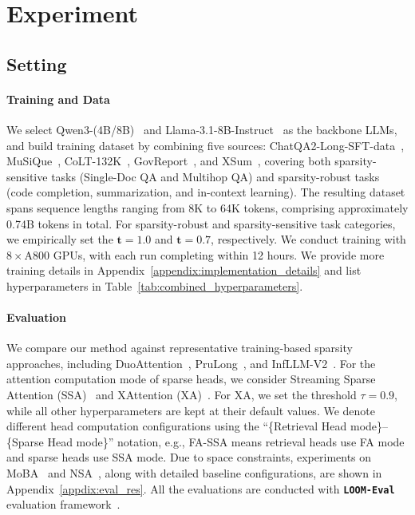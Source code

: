 

\section{Experiment}
\label{sec:experiment}

\subsection{Setting}
\label{subsec:exp_settings}

\paragraph{Training and Data}
\label{subsec:train_settings}
We select Qwen3-(4B/8B)~\citep{yang2025qwen3technicalreport} and Llama-3.1-8B-Instruct~\citep{grattafiori2024llama} as the backbone LLMs, and build training dataset by combining five sources: ChatQA2-Long-SFT-data~\citep{xu2024chatqa}, MuSiQue~\citep{trivedi2022musique}, CoLT-132K~\citep{li2025aixcoder}, GovReport~\citep{huang-etal-2021-efficient}, and XSum~\citep{xsum-emnlp}, covering both sparsity-sensitive tasks (Single-Doc QA and Multihop QA) and sparsity-robust tasks (code completion, summarization, and in-context learning).
The resulting dataset spans sequence lengths ranging from 8K to 64K tokens, comprising approximately 0.74B tokens in total. 
For sparsity-robust and sparsity-sensitive task categories, we empirically set the $\boldsymbol{t}=1.0$ and $\boldsymbol{t}=0.7$, respectively.
We conduct training with $8\times$A800 GPUs, with each run completing within 12 hours.
We provide more training details in Appendix~\ref{appendix:implementation_details} and list hyperparameters in Table~\ref{tab:combined_hyperparameters}.

\vspace{-0.5em}
\paragraph{Evaluation}
\label{subsec:baseline}
We compare our method against representative training-based sparsity approaches, including DuoAttention~\citep{xiaoduoattention2025}, PruLong~\citep{bhaskar2025cache}, and InfLLM-V2~\citep{infllmv2}. 
For the attention computation mode of sparse heads, we consider Streaming Sparse Attention (SSA)~\citep{streamingllm} and XAttention (XA)~\citep{xattention}.
For XA, we set the threshold $\tau=0.9$, while all other hyperparameters are kept at their default values.
We denote different head computation configurations using the ``\{Retrieval Head mode\}–\{Sparse Head mode\}'' notation, e.g., FA-SSA means retrieval heads use FA mode and sparse heads use SSA mode.
Due to space constraints, experiments on MoBA~\citep{moba} and NSA~\citep{NSA}, along with detailed baseline configurations, are shown in Appendix~\ref{appdix:eval_res}.
All the evaluations are conducted with \textbf{\texttt{LOOM-Eval}} evaluation framework~\citep{tang2025loom}.

